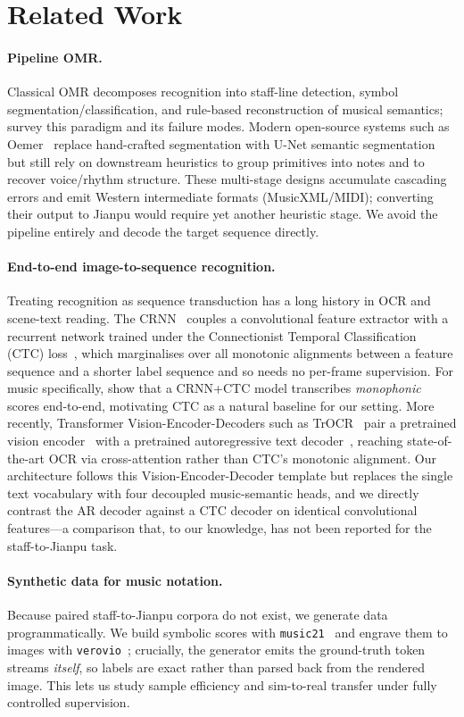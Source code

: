 \section{Related Work}
\label{section:related}

\paragraph{Pipeline OMR.} Classical OMR decomposes recognition into staff-line
detection, symbol segmentation/classification, and rule-based reconstruction of
musical semantics; \citet{calvo2020understanding} survey this paradigm and its
failure modes. Modern open-source systems such as Oemer~\citep{oemer2023} replace
hand-crafted segmentation with U-Net semantic segmentation but still rely on
downstream heuristics to group primitives into notes and to recover voice/rhythm
structure. These multi-stage designs accumulate cascading errors and emit Western
intermediate formats (MusicXML/MIDI); converting their output to Jianpu would
require yet another heuristic stage. We avoid the pipeline entirely and decode the
target sequence directly.

\paragraph{End-to-end image-to-sequence recognition.} Treating recognition as
sequence transduction has a long history in OCR and scene-text reading. The
CRNN~\citep{shi2015crnn} couples a convolutional feature extractor with a
recurrent network trained under the Connectionist Temporal Classification (CTC)
loss~\citep{graves2006ctc}, which marginalises over all monotonic alignments
between a feature sequence and a shorter label sequence and so needs no per-frame
supervision. For music specifically, \citet{calvozaragoza2018end} show that a
CRNN+CTC model transcribes \emph{monophonic} scores end-to-end, motivating CTC as
a natural baseline for our setting. More recently, Transformer
Vision-Encoder-Decoders such as TrOCR~\citep{li2021trocr} pair a pretrained vision
encoder~\citep{dosovitskiy2021vit} with a pretrained autoregressive text
decoder~\citep{lewis2020bart}, reaching state-of-the-art OCR via cross-attention
rather than CTC's monotonic alignment. Our architecture follows this
Vision-Encoder-Decoder template but replaces the single text vocabulary with four
decoupled music-semantic heads, and we directly contrast the AR decoder against a
CTC decoder on identical convolutional features---a comparison that, to our
knowledge, has not been reported for the staff-to-Jianpu task.

\paragraph{Synthetic data for music notation.} Because paired staff-to-Jianpu
corpora do not exist, we generate data programmatically. We build symbolic scores
with \texttt{music21}~\citep{cuthbert2010music21} and engrave them to images with
\texttt{verovio}~\citep{pugin2014verovio}; crucially, the generator emits the
ground-truth token streams \emph{itself}, so labels are exact rather than parsed
back from the rendered image. This lets us study sample efficiency and
sim-to-real transfer under fully controlled supervision.
